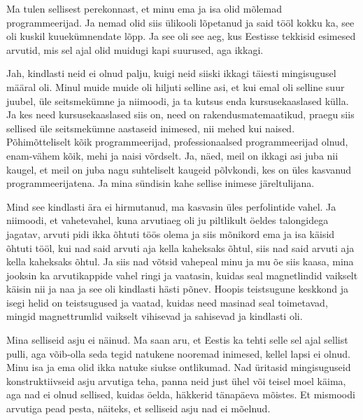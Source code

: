 Ma tulen sellisest perekonnast, et minu ema ja isa olid mõlemad 
programmeerijad. Ja nemad olid siis ülikooli lõpetanud ja  said tööl kokku ka, 
see oli kuskil kuuekümnendate lõpp. Ja see oli see aeg, kus Eestisse tekkisid 
esimesed arvutid, mis sel ajal olid muidugi kapi suurused, aga ikkagi.


Jah, kindlasti neid ei olnud palju, kuigi neid siiski ikkagi täiesti 
mingisugusel määral oli. Minul muide muide oli hiljuti selline asi, et kui emal 
oli selline suur juubel, üle seitsmekümne ja niimoodi, ja ta kutsus enda 
kursusekaaslased külla. Ja kes need kursusekaaslased siis on, need on 
rakendusmatemaatikud, praegu siis sellised üle seitsmekümne aastaseid  
inimesed, nii mehed kui naised. Põhimõtteliselt kõik programmeerijad, 
professionaalsed programmeerijad olnud, enam-vähem kõik, mehi ja naisi 
võrdselt. Ja, näed, meil on ikkagi asi juba nii kaugel, et meil on juba nagu 
suhteliselt kaugeid põlvkondi, kes on üles kasvanud programmeerijatena. Ja mina 
sündisin kahe sellise inimese järeltulijana.


Mind see kindlasti ära ei hirmutanud, ma kasvasin üles perfolintide vahel. Ja 
niimoodi, et vahetevahel, kuna arvutiaeg oli ju piltlikult öeldes talongidega 
jagatav, arvuti pidi ikka õhtuti töös olema ja siis mõnikord  ema ja isa käisid 
õhtuti tööl, kui nad said arvuti aja kella kaheksaks õhtul, siis nad said 
arvuti aja kella kaheksaks õhtul. Ja siis nad võtsid vahepeal minu ja mu õe 
siis kaasa, mina jooksin ka arvutikappide vahel ringi ja vaatasin, kuidas seal 
magnetlindid vaikselt käisin nii ja naa ja see oli kindlasti hästi põnev. 
Hoopis teistsugune keskkond ja isegi helid on teistsugused ja vaatad, kuidas 
need masinad seal toimetavad, mingid magnettrumlid vaikselt vihisevad ja 
sahisevad ja kindlasti oli.


Mina selliseid asju ei näinud. Ma saan aru, et Eestis ka tehti selle sel ajal 
sellist  pulli, aga võib-olla  seda tegid natukene nooremad inimesed, kellel 
lapsi ei olnud. Minu isa ja ema olid ikka natuke siukse ontlikumad. Nad 
üritasid mingisuguseid konstruktiivseid asju arvutiga teha,  panna neid just 
ühel või teisel moel  käima, aga nad ei olnud sellised, kuidas öelda, häkkerid 
tänapäeva mõistes. Et  mismoodi arvutiga  pead pesta, näiteks, et selliseid 
asju nad ei mõelnud.

